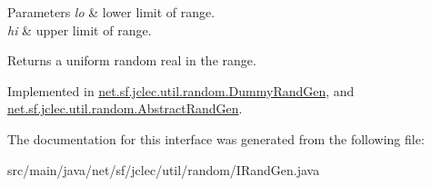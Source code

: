 \begin{DoxyParams}{Parameters}
{\em lo} & lower limit of range. \\
\hline
{\em hi} & upper limit of range.\\
\hline
\end{DoxyParams}
\begin{DoxyReturn}{Returns}
a uniform random real in the range. 
\end{DoxyReturn}


Implemented in \hyperlink{classnet_1_1sf_1_1jclec_1_1util_1_1random_1_1_dummy_rand_gen_a327d55b8d886a4ea4c8b20e685ad3031}{net.\-sf.\-jclec.\-util.\-random.\-Dummy\-Rand\-Gen}, and \hyperlink{classnet_1_1sf_1_1jclec_1_1util_1_1random_1_1_abstract_rand_gen_a24478e919b8d389d4e26b52f2532307c}{net.\-sf.\-jclec.\-util.\-random.\-Abstract\-Rand\-Gen}.



The documentation for this interface was generated from the following file\-:\begin{DoxyCompactItemize}
\item 
src/main/java/net/sf/jclec/util/random/I\-Rand\-Gen.\-java\end{DoxyCompactItemize}
